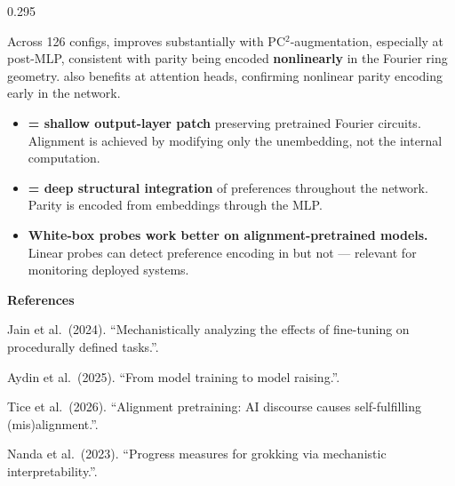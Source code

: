 \documentclass[final]{beamer}
\newcommand{\POST}{\cPOST}
\newcommand{\PTG}{\cPTG}
\begin{document}
\begin{frame}[t]{}
\begin{columns}[T]
\begin{column}{0.295\textwidth}
\begin{posterbox}
\vspace{4pt}
Across 126 configs, \POST{} improves substantially with PC$^2$-augmentation, especially at post-MLP, consistent with parity being encoded \textbf{nonlinearly} in the Fourier ring geometry.
\PTG{} also benefits at attention heads, confirming nonlinear parity encoding early in the network.
\end{posterbox}

\vspace{18pt}

\vspace{2pt}
\begin{takeawaybox}
\posterbody
\begin{itemize}[leftmargin=*, itemsep=6pt]
  \item \textbf{\POST{} = shallow output-layer patch} preserving pretrained Fourier circuits. Alignment is achieved by modifying only the unembedding, not the internal computation.
  \item \textbf{\PTG{} = deep structural integration} of preferences throughout the network. Parity is encoded from embeddings through the MLP.
  \item \textbf{White-box probes work better on alignment-pretrained models.} Linear probes can detect preference encoding in \PTG{} but not \POST{} --- relevant for monitoring deployed systems.
\end{itemize}
\end{takeawaybox}

\vspace{12pt}

{\posterref
\textbf{References}\\[3pt]
\begin{enumerate}[leftmargin=*, itemsep=1pt, label={[\arabic*]}]
  \item Jain et al.\ (2024). ``Mechanistically analyzing the effects of fine-tuning on procedurally defined tasks.''.
  \item Aydin et al.\ (2025). ``From model training to model raising.''.
  \item Tice et al.\ (2026). ``Alignment pretraining: AI discourse causes self-fulfilling (mis)alignment.''.
  \item Nanda et al.\ (2023). ``Progress measures for grokking via mechanistic interpretability.''.
\end{enumerate}
}

\end{column}

\end{columns}

\vfill
\vspace{1.25cm}
\hspace{-1.05cm}%
\begin{tcolorbox}[
  enhanced,
  width=\paperwidth,
  colback=bannercolor,
  colframe=bannercolor,
  boxrule=0pt,
  arc=0pt,
  left=0pt, right=0pt, top=0.3cm, bottom=0.3cm,
  boxsep=0pt,
]
\phantom{x}
\end{tcolorbox}

\end{frame}
\end{document}
